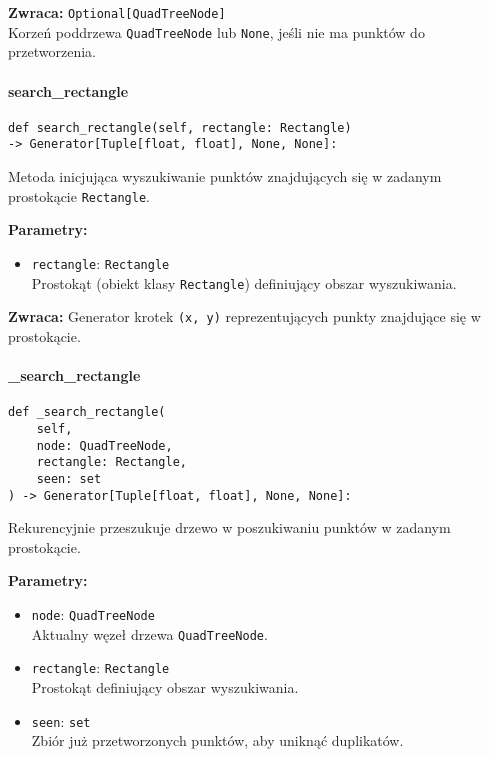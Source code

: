 \documentclass[12pt]{article}
\begin{document}
\textbf{Zwraca:} 
\texttt{Optional[QuadTreeNode]} \\
Korzeń poddrzewa \texttt{QuadTreeNode} lub \texttt{None}, jeśli nie ma punktów do przetworzenia.

\paragraph{search\_rectangle}

\begin{verbatim}
def search_rectangle(self, rectangle: Rectangle) 
-> Generator[Tuple[float, float], None, None]:
\end{verbatim}

\noindent Metoda inicjująca wyszukiwanie punktów znajdujących się w zadanym prostokącie \texttt{Rectangle}.

\noindent\textbf{Parametry:}
\begin{itemize}
    \item \texttt{rectangle}: \texttt{Rectangle} \\
    Prostokąt (obiekt klasy \texttt{Rectangle}) definiujący obszar wyszukiwania.
\end{itemize}

\textbf{Zwraca:} 
Generator krotek \texttt{(x, y)} reprezentujących punkty znajdujące się w prostokącie.

\paragraph{\_search\_rectangle}

\begin{verbatim}
def _search_rectangle(
    self,
    node: QuadTreeNode,
    rectangle: Rectangle,
    seen: set
) -> Generator[Tuple[float, float], None, None]:
\end{verbatim}

\noindent Rekurencyjnie przeszukuje drzewo w poszukiwaniu punktów w zadanym prostokącie.

\noindent\textbf{Parametry:}
\begin{itemize}
    \item \texttt{node}: \texttt{QuadTreeNode} \\
    Aktualny węzeł drzewa \texttt{QuadTreeNode}.
    
    \item \texttt{rectangle}: \texttt{Rectangle} \\
    Prostokąt definiujący obszar wyszukiwania.
    
    \item \texttt{seen}: \texttt{set} \\
    Zbiór już przetworzonych punktów, aby uniknąć duplikatów.
\end{itemize}
\end{document}
